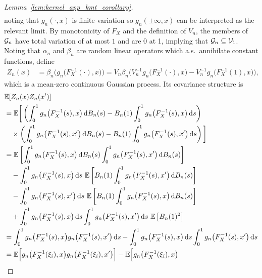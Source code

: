 \begin{proof}[Lemma~\ref{lem:kernel_app_kmt_corollary}]
\begin{align*}
  \end{align*}
  noting that $g_n(\cdot,x)$
  is finite-variation so
  $g_n(\pm \infty, x)$
  can be interpreted as
  the relevant limit.
  By monotonicity of $F_X$ and the definition of $V_n$,
  the members of $\mathcal{G}_n$ have total variation of at most $1$
  and are 0 at 1, implying that
  $\mathcal{G}_n \subseteq \mathcal{V}_1$.
  Noting that $\alpha_n$ and $\beta_n$ are random
  linear operators which a.s.\ annihilate
  constant functions,
  define
  \begin{align*}
    Z_n(x)
    &=
    \beta_n \Big(g_n\big(F_X^{-1}(\cdot), x\big)\Big)
    = V_n \beta_n \Big(
      V_n^{-1} g_n\big(F_X^{-1}(\cdot), x\big)
      - V_n^{-1} g_n\big(F_X^{-1}(1), x\big)
    \Big),
  \end{align*}
  which is a mean-zero continuous Gaussian process.
  Its covariance structure is
  \begin{align*}
    &\E[Z_n(x) Z_n(x')] \\
    &=
    \E\bigg[
      \left(
        \int_0^1 g_n\big(F_X^{-1}(s),x\big) \diff{B_n(s)}
        - B_n(1) \int_0^1 g_n\big(F_X^{-1}(s),x\big) \diff{s}
      \right) \\
      &\quad\times
      \left(
        \int_0^1 g_n\big(F_X^{-1}(s),x'\big) \diff{B_n(s)}
        - B_n(1) \int_0^1 g_n\big(F_X^{-1}(s),x'\big) \diff{s}
      \right)
    \bigg] \\
    &=
    \E\left[
      \int_0^1 g_n\big(F_X^{-1}(s),x\big) \diff{B_n(s)}
      \int_0^1 g_n\big(F_X^{-1}(s),x'\big) \diff{B_n(s)}
    \right] \\
    &\quad- \int_0^1 g_n\big(F_X^{-1}(s),x\big) \diff{s} \
    \E\left[
      B_n(1) \int_0^1 g_n\big(F_X^{-1}(s),x'\big) \diff{B_n(s)}
    \right] \\
    &\quad-
    \int_0^1 g_n\big(F_X^{-1}(s),x'\big) \diff{s} \
    \E\left[
      B_n(1) \int_0^1 g_n\big(F_X^{-1}(s),x\big) \diff{B_n(s)}
    \right] \\
    &\quad+
    \int_0^1 g_n\big(F_X^{-1}(s),x\big) \diff{s}
    \int_0^1 g_n\big(F_X^{-1}(s),x'\big) \diff{s} \
    \E\left[
      B_n(1)^2
    \right] \\
    &=
    \int_0^1 g_n\big(F_X^{-1}(s),x\big)
    g_n\big(F_X^{-1}(s),x'\big) \diff{s}
    - \int_0^1 g_n\big(F_X^{-1}(s),x\big) \diff{s}
    \int_0^1 g_n\big(F_X^{-1}(s),x'\big) \diff{s} \\
    &=
    \E\Big[
      g_n\big(F_X^{-1}(\xi_i), x\big)
      g_n\big(F_X^{-1}(\xi_i), x'\big)
    \Big]
    - \E\Big[
      g_n\big(F_X^{-1}(\xi_i), x\big)

\end{align*}
\end{proof}

